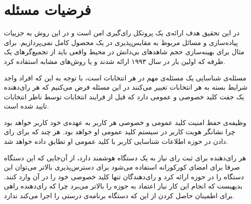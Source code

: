 \section{فرضیات مسئله}
در این تحقیق هدف ارائه‌ی یک پروتکل رای‌گیری امن است و در این روش به جزییات پیاده‌سازی و مسائل مربوط به مقایس‌پذیری در یک محصول کامل نمی‌پردازیم. برای مثال برای بهینه‌سازی حجم شاهد‌های بی‌دانش در محیط واقعی باید از تجمیع‌گر‌های یک طرفه 
که اولین بار در سال ۱۹۹۳ 
\cite{oneway}
ارائه شدند و یا روش‌های مشابه استفاده کرد. 
\par
مسئله‌ی شناسایی یک مسئله‌ی مهم در هر انتخابات است، با توجه به این که افراد واجد شرایط بسته به هر انتخابات تغییر می‌کنند در این مسئله فرض می‌کنیم که هر رای‌دهنده یک جفت کلید خصوصی و عمومی دارد که قبل از فرایند انتخابات توسط ناظر انتخابات تایید شده است. 
\par
وظیفه‌ی حفظ امنیت کلید عمومی و خصوصی هر کاربر به عهده‌ی خود کاربر خواهد بود چرا نشانگر هویت کاربر در سیستم‌ کلید عمومی او خواهد بود. هر چند که برای رای دادن در حوزه اطلاعات شناسایی کاربر با کلید عمومی او تطابق داده خواهد شد.
\par
هر رای‌دهنده برای ثبت رای نیاز به یک دستگاه هوشمند دارد، از آن‌جایی که این دستگاه صرفا برای امضای کورکورانه استفاده می‌شود برای دسترس‌پذیری بالاتر می‌توان این دستگاه را در حوزه ارائه کرد و رای‌دهندگان تنها کلید خصوصی خود را در آن وارد کنند. بدیهیست که انجام این کار نیاز اعتماد به حوزه را بالاتر می‌برد چرا که رای‌دهنده راهی برای اطمینان حاصل کردن از این که دستگاه برنامه‌ی درستی را اجرا می‌کند ندارد.

